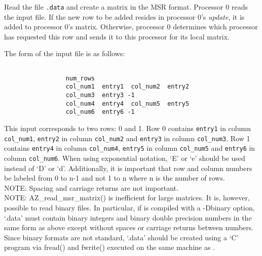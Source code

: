 
\vspace{2em}
{ \hrulefill}
\vspace{1em}

Read the file \verb'.data' and create a matrix in the MSR format.  Processor 0
reads the input file.  If the new row to be added resides in processor 0's {\it
  update\/}, it is added to processor 0's matrix. Otherwise, processor 0
determines which processor has requested this row and sends it to this
processor for its local matrix.

The form of the input file is as follows:
\begin{verbatim}

                 num_rows
                 col_num1  entry1  col_num2  entry2
                 col_num3  entry3 -1
                 col_num4  entry4  col_num5  entry5
                 col_num6  entry6 -1

\end{verbatim}

This input corresponds to two rows: 0 and 1.  Row 0 contains \verb'entry1' in
column \verb'col_num1', \verb'entry2' in column \verb'col_num2' and
\verb'entry3' in column \verb'col_num3'. Row 1 contains \verb'entry4' in column
\verb'col_num4', \verb'entry5' in column \verb'col_num5' and \verb'entry6' in
column \verb'col_num6'.  When using exponential notation, `E' or `e' should be
used instead of `D' or `d'. Additionally, it is important that row and column
numbers be labeled from 0 to n-1 and not 1 to n where n is the number of rows.\\[12pt]
NOTE: Spacing and carriage returns are not important.\\[10pt]
NOTE: AZ\_read\_msr\_matrix() is inefficient for large matrices.  It is,
however, possible to read binary files. In particular, if \Az{} is compiled
with a -Dbinary option, `.data' must contain binary integers and binary double
precision numbers in the same form as above except without spaces or carriage
returns between numbers.  Since binary formats are not standard, `.data' should
be created using a `C' program via fread() and fwrite() executed on the same
machine as \Az{}.

\vspace{2em}
{ \hrulefill}
\vspace{1em}

